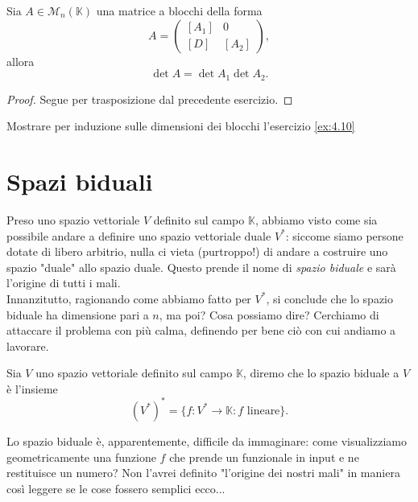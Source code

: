 \begin{cor}
    Sia $A \in \mathcal{M}_n(\mathbb{K})$ una matrice a blocchi della forma
    $$
        A = \begin{pmatrix}
            [A_1] & 0 \\
            [D] & [A_2]
        \end{pmatrix},
    $$ allora
    $$
        \det{A} = \det{A_1} \det{A_2}.
    $$
\end{cor}
\begin{proof}
    Segue per trasposizione dal precedente esercizio.
\end{proof}
\begin{exercise}
    Mostrare per induzione sulle dimensioni dei blocchi l'esercizio \ref{ex:4.10}
\end{exercise}


\section{Spazi biduali}

Preso uno spazio vettoriale $V$ definito sul campo $\mathbb{K}$, abbiamo visto come sia possibile andare a definire uno spazio vettoriale duale $V^*$: siccome siamo persone dotate di libero arbitrio, nulla ci vieta (purtroppo!) di andare a costruire uno spazio "duale" allo spazio duale. Questo prende il nome di \emph{spazio biduale} e sarà l'origine di tutti i mali. \\
Innanzitutto, ragionando come abbiamo fatto per $V^*$, si conclude che lo spazio biduale ha dimensione pari a $n$, ma poi? Cosa possiamo dire? Cerchiamo di attaccare il problema con più calma, definendo per bene ciò con cui andiamo a lavorare.

\begin{definition}
    Sia $V$ uno spazio vettoriale definito sul campo $\mathbb{K}$, diremo che lo spazio biduale a $V$ è l'insieme
    $$
        (V^*)^* = \{ f: V^* \to \mathbb{K} : f \text{ lineare}\}.
    $$
\end{definition}
Lo spazio biduale è, apparentemente, difficile da immaginare: come visualizziamo geometricamente una funzione $f$ che prende un funzionale in input e ne restituisce un numero? Non l'avrei definito "l'origine dei nostri mali" in maniera così leggere se le cose fossero semplici ecco... \\

